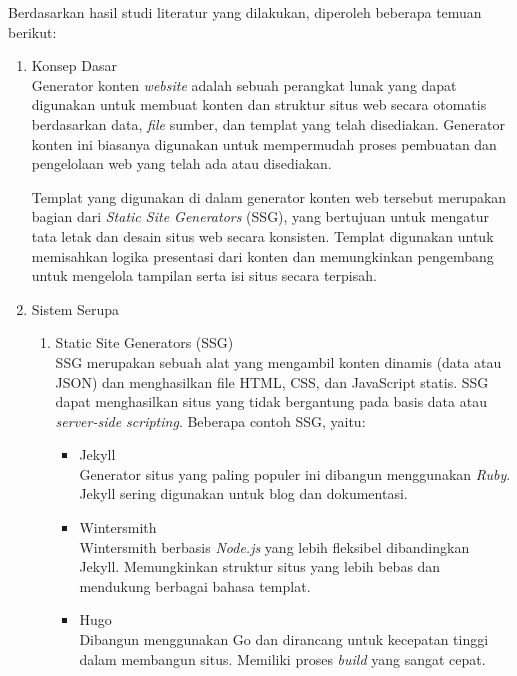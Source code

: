 Berdasarkan hasil studi literatur yang dilakukan, diperoleh beberapa temuan berikut:
\begin{enumerate}[label*=\arabic*.,ref=\arabic*]
    \item Konsep Dasar \\
    Generator konten \textit{website} adalah sebuah perangkat lunak yang dapat digunakan untuk membuat konten dan struktur situs web secara otomatis berdasarkan data, \textit{file} sumber, dan templat yang telah disediakan. Generator konten ini biasanya digunakan untuk mempermudah proses pembuatan dan pengelolaan web yang telah ada atau disediakan. 

    Templat yang digunakan di dalam generator konten web tersebut merupakan bagian dari \textit{Static Site Generators} (SSG), yang bertujuan untuk mengatur tata letak dan desain situs web secara konsisten. Templat digunakan untuk memisahkan logika presentasi dari konten dan memungkinkan pengembang untuk mengelola tampilan serta isi situs secara terpisah. 

    \item Sistem Serupa
        \begin{enumerate}[label=\alph*.]
            \item Static Site Generators (SSG) \\
            SSG merupakan sebuah alat yang mengambil konten dinamis (data atau JSON) dan menghasilkan file HTML, CSS, dan JavaScript statis. SSG dapat menghasilkan situs yang tidak bergantung pada basis data atau \textit{server-side scripting}. Beberapa contoh SSG, yaitu:
                \begin{itemize}
                    \item Jekyll \\
                    Generator situs yang paling populer ini dibangun menggunakan \textit{Ruby}. Jekyll sering digunakan untuk blog dan dokumentasi.
                    \item Wintersmith \\
                    Wintersmith berbasis \textit{Node.js} yang lebih fleksibel dibandingkan Jekyll. Memungkinkan struktur situs yang lebih bebas dan mendukung berbagai bahasa templat. 
                    \item Hugo \\
                    Dibangun menggunakan Go dan dirancang untuk kecepatan tinggi dalam membangun situs. Memiliki proses \textit{build} yang sangat cepat.
                \end{itemize}


\end{enumerate}
\end{enumerate}
